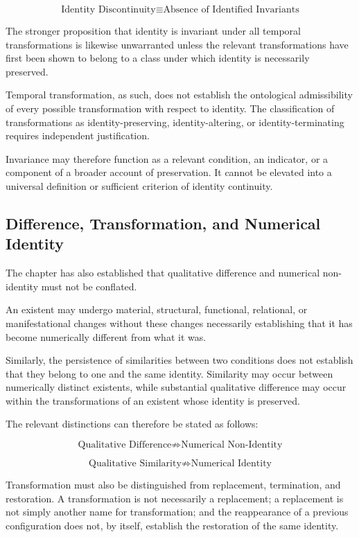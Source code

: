 \[
\text{Identity Discontinuity}
\equiv
\text{Absence of Identified Invariants}
\]

The stronger proposition that identity is invariant under all temporal
transformations is likewise unwarranted unless the relevant transformations
have first been shown to belong to a class under which identity is necessarily
preserved.

Temporal transformation, as such, does not establish the ontological
admissibility of every possible transformation with respect to identity.
The classification of transformations as identity-preserving, identity-altering,
or identity-terminating requires independent justification.

Invariance may therefore function as a relevant condition, an indicator, or
a component of a broader account of preservation. It cannot be elevated into
a universal definition or sufficient criterion of identity continuity.

\subsection{Difference, Transformation, and Numerical Identity}

The chapter has also established that qualitative difference and numerical
non-identity must not be conflated.

An existent may undergo material, structural, functional, relational, or
manifestational changes without these changes necessarily establishing that
it has become numerically different from what it was.

Similarly, the persistence of similarities between two conditions does not
establish that they belong to one and the same identity. Similarity may occur
between numerically distinct existents, while substantial qualitative
difference may occur within the transformations of an existent whose identity
is preserved.

The relevant distinctions can therefore be stated as follows:

\[
\text{Qualitative Difference}
\not\Rightarrow
\text{Numerical Non-Identity}
\]

\[
\text{Qualitative Similarity}
\not\Rightarrow
\text{Numerical Identity}
\]

Transformation must also be distinguished from replacement, termination,
and restoration. A transformation is not necessarily a replacement; a
replacement is not simply another name for transformation; and the
reappearance of a previous configuration does not, by itself, establish
the restoration of the same identity.

